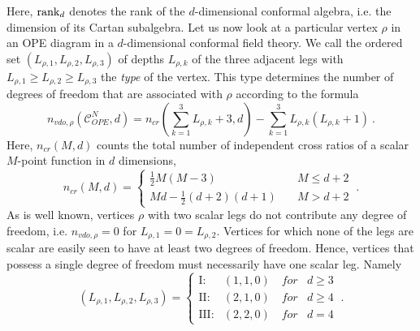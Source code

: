 \documentclass{article}
\begin{document}
Here, $\rank_d$ denotes the rank of the $d$-dimensional conformal algebra, i.e. the 
dimension of its Cartan subalgebra. Let us now look at a particular vertex $\rho$ 
in an OPE diagram in a $d$-dimensional conformal field theory. We call the ordered set 
$(L_{\rho,1},L_{\rho,2},L_{\rho,3})$ of depths $L_{\rho,k}$ of the three adjacent 
legs with $L_{\rho,1}\geq L_{\rho,2} \geq L_{\rho,3}$ the \textit{type} of 
the vertex. This type determines the number of degrees of freedom that are 
associated with $\rho$ according to the formula 
\begin{equation} \label{eq:novertrest} 
n_{\textit{vdo},\rho}(\mathcal{C}^N_\textit{OPE},d) = 
n_\textit{cr}(\sum_{k=1}^3 L_{\rho,k}+3,d) - 
\sum_{k=1}^3 L_{\rho,k} (L_{\rho,k}+1)  \ . 
\end{equation}
Here, $n_\textit{cr}(M,d)$ counts the total number of independent cross ratios of a 
scalar $M$-point function in $d$ dimensions,  
\begin{equation}
n_\textit{cr} (M,d) = \left\{ \begin{array}{ll} \frac12 M (M-3) \quad & M \leq d + 2 \\[3mm] 
Md - \frac12(d+2)(d+1) \quad &  M > d + 2 \end{array} \right. \ .  
\end{equation} 
As is well known, vertices $\rho$ with two scalar legs do not contribute any degree of 
freedom, i.e. $n_{\textit{vdo},\rho} = 0$ for $L_{\rho,1} = 0 = L_{\rho,2}$. Vertices 
for which none of the legs are scalar are easily seen to have at least two degrees of 
freedom. Hence, vertices that possess a single degree of freedom must necessarily have 
one scalar leg. Namely 
\begin{equation} \label{eq:list}  
(L_{\rho,1},L_{\rho,2},L_{\rho,3}) = \left\{ 
\begin{array}{rll}  \text{I}: & (1,1,0) \quad \textit{for} & d \geq 3 \\[1mm]
                   \text{II}: & (2,1,0) \quad \textit{for} & d \geq 4 \\[1mm]  
                   \text{III}:& (2,2,0) \quad \textit{for} & d = 4 
                   \end{array} \right. \ . 
\end{equation} 
\end{document}
